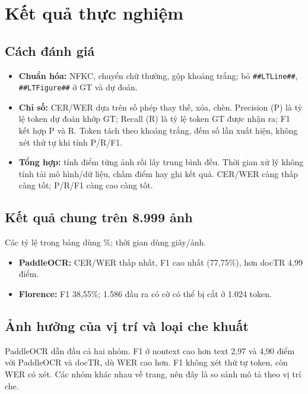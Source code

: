 \section{Kết quả thực nghiệm}
\subsection{Cách đánh giá}
\begin{itemize}
\item \textbf{Chuẩn hóa:} NFKC, chuyển chữ thường, gộp khoảng trắng; bỏ
\texttt{\#\#LTLine\#\#}, \texttt{\#\#LTFigure\#\#} ở GT và dự đoán.
\item \textbf{Chỉ số:} CER/WER dựa trên số phép thay thế, xóa, chèn. Precision
(P) là tỷ lệ token dự đoán khớp GT; Recall (R) là tỷ lệ token GT được nhận ra;
F1 kết hợp P và R. Token tách theo khoảng trắng, đếm số lần xuất hiện, không xét
thứ tự khi tính P/R/F1.
\item \textbf{Tổng hợp:} tính điểm từng ảnh rồi lấy trung bình đều. Thời gian xử
lý không tính tải mô hình/dữ liệu, chấm điểm hay ghi kết quả. CER/WER càng thấp
càng tốt; P/R/F1 càng cao càng tốt.
\end{itemize}

\subsection{Kết quả chung trên 8.999 ảnh}
Các tỷ lệ trong bảng dùng \%; thời gian dùng giây/ảnh.

\begingroup\fontsize{10}{11.5}\selectfont
\setlength{\tabcolsep}{4pt}

\par\endgroup
\begin{itemize}
\item \textbf{PaddleOCR:} CER/WER thấp nhất, F1 cao nhất (77,75\%), hơn docTR 4,99 điểm.
\item \textbf{Florence:} F1 38,55\%; 1.586 đầu ra có cờ có thể bị cắt ở 1.024 token.
\end{itemize}

\clearpage
\subsection{Ảnh hưởng của vị trí và loại che khuất}
\begingroup\fontsize{10}{11.5}\selectfont
\setlength{\tabcolsep}{4pt}

\par\endgroup
PaddleOCR dẫn đầu cả hai nhóm. F1 ở nontext cao hơn text 2,97 và 4,90 điểm với
PaddleOCR và docTR, dù WER cao hơn. F1 không xét thứ tự token, còn WER có xét. Các nhóm
khác nhau về trang, nên đây là so sánh mô tả theo vị trí che.

